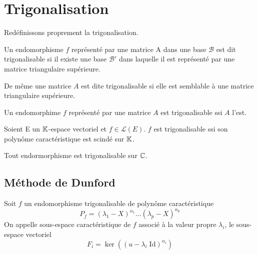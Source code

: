
\section{Trigonalisation}

Redéfinissons proprement la trigonalisation. 

\begin{definition}[Trigonalisation]
    Un endomorphisme $f$ représenté par une matrice A dans une base $\mathcal{B}$ est dit trigonalisable si 
    il existe une base $\mathcal{B}'$ dans laquelle il est représenté par une matrice triangulaire supérieure. 

    \vspace{0.3cm}

    De même une matrice $A$ est dite trigonalisable si elle est semblable à une matrice triangulaire supérieure. 
\end{definition}

\begin{prop}
    Un endomorphime $f$ représenté par une matrice $A$ est trigonalisable ssi $A$ l'est. 
\end{prop}


\begin{criteria}
    Soient E un $\mathbb{K}$-espace vectoriel et $f \in \mathcal{L}(E)$. $f$ est trigonalisable ssi son polynôme caractéristique est scindé sur $\mathbb{K}$. 
\end{criteria}

\begin{corollary}[La puissance de $\C$]
    Tout endormorphisme est trigonalisable sur $\C$. 
\end{corollary}

\subsection{Méthode de Dunford}


\begin{definition}
    Soit $f$ un endomorphisme trigonalisable de polynôme caractéristique 
        $$ P_f = (\lambda_1 - X)^{\alpha_1} \dots (\lambda_p -X)^{\alpha_p} $$ 
    On appelle sous-espace caractéristique de $f$ associé à la valeur propre $\lambda_i$, le sous-espace vectoriel 
        $$ \boxed{ F_i = \ker((u - \lambda_i \; \text{Id})^{\alpha_i}) } $$ 
\end{definition}

